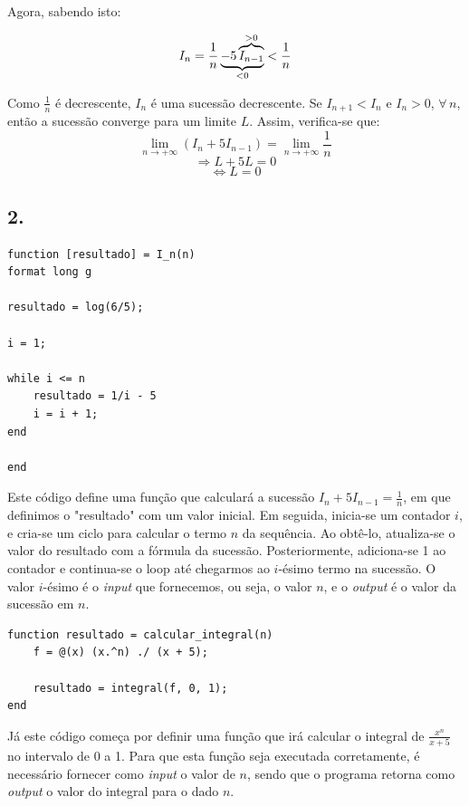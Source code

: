 \documentclass[12pt,a4paper]{article}
\begin{document}
Agora, sabendo isto:

\[
I_n = \frac{1}{n} \underbrace{- 5 \overbrace{I_{n-1}}^{\text{>0}}}_{\text{<0}} < {1 \over n}
\]



Como \(\frac{1}{n}\) é decrescente, \(I_n\) é uma sucessão decrescente. 
Se \(I_{n+1} < I_n\) e \(I_n > 0\), \(\forall \, n\), então a sucessão converge para um limite \(L\).
 Assim, verifica-se que:
\[
\lim_{n \to +\infty} \left( I_n + 5I_{n-1} \right) = \lim_{n \to +\infty} \frac{1}{n}
\]
\[
\Rightarrow L + 5L = 0
\]
\[
\Leftrightarrow L = 0
\]
\hfill \Box


 









    \subsection{2.}

    \begin{lstlisting}
function [resultado] = I_n(n)
format long g

resultado = log(6/5);

i = 1;

while i <= n
    resultado = 1/i - 5 
    i = i + 1; 
end

end
    \end{lstlisting}

Este código define uma função que calculará a sucessão \( I_n + 5I_{n-1} = \frac{1}{n} \), em que definimos o "resultado" com um valor inicial. Em seguida, inicia-se um contador \( i \), e cria-se um ciclo para calcular o termo \( n \) da sequência. Ao obtê-lo, atualiza-se o valor do resultado com a fórmula da sucessão. Posteriormente, adiciona-se 1 ao contador e continua-se o loop até chegarmos ao \( i \)-ésimo termo na sucessão. O valor \( i \)-ésimo é o \textit{input} que fornecemos, ou seja, o valor \( n \), e o \textit{output} é o valor da sucessão em \( n \).\\


    \begin{lstlisting}
function resultado = calcular_integral(n)
    f = @(x) (x.^n) ./ (x + 5);

    resultado = integral(f, 0, 1);
end
    \end{lstlisting}

Já este código começa por definir uma função que irá calcular o integral de \( \frac{x^n}{x+5} \) no intervalo de 0 a 1. Para que esta função seja executada corretamente, é necessário fornecer como \textit{input} o valor de \( n \), sendo que o programa retorna como \textit{output} o valor do integral para o dado \( n \).\\
\end{document}
